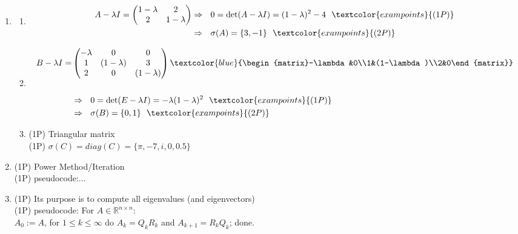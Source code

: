 {\color{solution}
\begin{enumerate}
	\item \begin{enumerate}
		\item 
		\begin{align*}
		A-\lambda I=\begin{pmatrix}1-\lambda&2\\2&1-\lambda\end{pmatrix}&\Rightarrow~~0
		=\text{det}(A-\lambda I)
		= (1-\lambda)^2 - 4~~\textcolor{exampoints}{(1P)}\\
		&\Rightarrow~~\sigma(A)=\{3,-1\}~~\textcolor{exampoints}{(2P)}
		\end{align*}
		\item 
		\begin{align*}
		B-\lambda I=&\begin{pmatrix}-\lambda&0&0\\1&(1-\lambda)&3\\2&0&(1-\lambda)\end{pmatrix}\textcolor{blue}{\begin{matrix}-\lambda&0\\1&(1-\lambda)\\2&0\end{matrix}}\\
		&\\
		&\Rightarrow~~0
		=\text{det}(E-\lambda I)
		=-\lambda(1-\lambda)^2~~\textcolor{exampoints}{(1P)}\\
		&\Rightarrow~~\sigma(B)=\{0,1\}~~\textcolor{exampoints}{( 2P)}
		\end{align*}
		\item \textcolor{exampoints}{(1P)} Triangular matrix\\
	 \textcolor{exampoints}{(1P)}	$ \sigma(C) = diag(C) = \{\pi, -7, i, 0, 0.5\}$
	\end{enumerate}
\item  \textcolor{exampoints}{(1P)} Power Method/Iteration\\
\textcolor{exampoints}{(1P)} pseudocode:...
\item \textcolor{exampoints}{(1P)} Its purpose is to compute all eigenvalues (and eigenvectors)\\
 \textcolor{exampoints}{(1P)} pseudocode: For $A \in \mathbb{R}^{n\times n}$:\\$A_0 := A$, for $1\leq k\leq \infty$ do $A_{k }= Q_kR_k$ and $A_{k+1 }= R_kQ_k$; done.
\end{enumerate}
}
